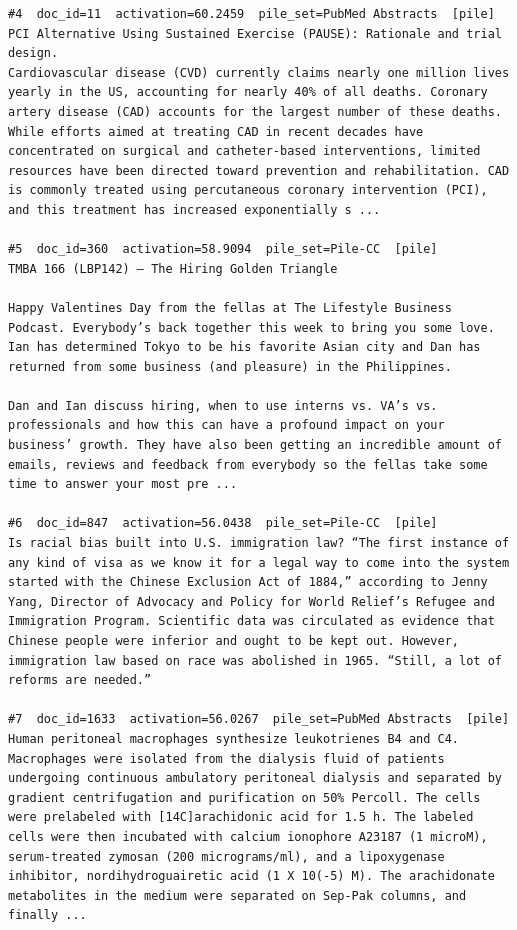\begin{verbatim}
#4  doc_id=11  activation=60.2459  pile_set=PubMed Abstracts  [pile]
PCI Alternative Using Sustained Exercise (PAUSE): Rationale and trial design.
Cardiovascular disease (CVD) currently claims nearly one million lives yearly in the US, accounting for nearly 40% of all deaths. Coronary artery disease (CAD) accounts for the largest number of these deaths. While efforts aimed at treating CAD in recent decades have concentrated on surgical and catheter-based interventions, limited resources have been directed toward prevention and rehabilitation. CAD is commonly treated using percutaneous coronary intervention (PCI), and this treatment has increased exponentially s ...

#5  doc_id=360  activation=58.9094  pile_set=Pile-CC  [pile]
TMBA 166 (LBP142) – The Hiring Golden Triangle

Happy Valentines Day from the fellas at The Lifestyle Business Podcast. Everybody’s back together this week to bring you some love. Ian has determined Tokyo to be his favorite Asian city and Dan has returned from some business (and pleasure) in the Philippines.

Dan and Ian discuss hiring, when to use interns vs. VA’s vs. professionals and how this can have a profound impact on your business’ growth. They have also been getting an incredible amount of emails, reviews and feedback from everybody so the fellas take some time to answer your most pre ...

#6  doc_id=847  activation=56.0438  pile_set=Pile-CC  [pile]
Is racial bias built into U.S. immigration law? “The first instance of any kind of visa as we know it for a legal way to come into the system started with the Chinese Exclusion Act of 1884,” according to Jenny Yang, Director of Advocacy and Policy for World Relief’s Refugee and Immigration Program. Scientific data was circulated as evidence that Chinese people were inferior and ought to be kept out. However, immigration law based on race was abolished in 1965. “Still, a lot of reforms are needed.”

#7  doc_id=1633  activation=56.0267  pile_set=PubMed Abstracts  [pile]
Human peritoneal macrophages synthesize leukotrienes B4 and C4.
Macrophages were isolated from the dialysis fluid of patients undergoing continuous ambulatory peritoneal dialysis and separated by gradient centrifugation and purification on 50% Percoll. The cells were prelabeled with [14C]arachidonic acid for 1.5 h. The labeled cells were then incubated with calcium ionophore A23187 (1 microM), serum-treated zymosan (200 micrograms/ml), and a lipoxygenase inhibitor, nordihydroguairetic acid (1 X 10(-5) M). The arachidonate metabolites in the medium were separated on Sep-Pak columns, and finally ...


\end{verbatim}
